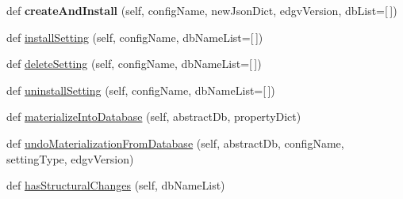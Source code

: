 \begin{DoxyCompactItemize}
\mbox{\label{class_dsg_tools_1_1_server_management_tools_1_1generic_db_manager_1_1_generic_db_manager_a36692ac14c0df8bba4606481d0fc931a}} 
def {\bfseries create\+And\+Install} (self, config\+Name, new\+Json\+Dict, edgv\+Version, db\+List=\mbox{[}$\,$\mbox{]})
\item 
def \mbox{\hyperlink{class_dsg_tools_1_1_server_management_tools_1_1generic_db_manager_1_1_generic_db_manager_a6221e5ae58ee912401f15a9c6708bb25}{install\+Setting}} (self, config\+Name, db\+Name\+List=\mbox{[}$\,$\mbox{]})
\item 
def \mbox{\hyperlink{class_dsg_tools_1_1_server_management_tools_1_1generic_db_manager_1_1_generic_db_manager_a3154565227241e71d7a8763f978aa7a4}{delete\+Setting}} (self, config\+Name, db\+Name\+List=\mbox{[}$\,$\mbox{]})
\item 
def \mbox{\hyperlink{class_dsg_tools_1_1_server_management_tools_1_1generic_db_manager_1_1_generic_db_manager_a5b45d7939d1ec1d6d4294de4fb84805f}{uninstall\+Setting}} (self, config\+Name, db\+Name\+List=\mbox{[}$\,$\mbox{]})
\item 
def \mbox{\hyperlink{class_dsg_tools_1_1_server_management_tools_1_1generic_db_manager_1_1_generic_db_manager_a38ba344295e7df9c16d05ace9f2ec8f3}{materialize\+Into\+Database}} (self, abstract\+Db, property\+Dict)
\item 
def \mbox{\hyperlink{class_dsg_tools_1_1_server_management_tools_1_1generic_db_manager_1_1_generic_db_manager_a6888cc54a692a094b7f0651939bbc852}{undo\+Materialization\+From\+Database}} (self, abstract\+Db, config\+Name, setting\+Type, edgv\+Version)
\item 
def \mbox{\hyperlink{class_dsg_tools_1_1_server_management_tools_1_1generic_db_manager_1_1_generic_db_manager_ada6319f12f97e937d8107a0655eea9a5}{has\+Structural\+Changes}} (self, db\+Name\+List)
\end{DoxyCompactItemize}
